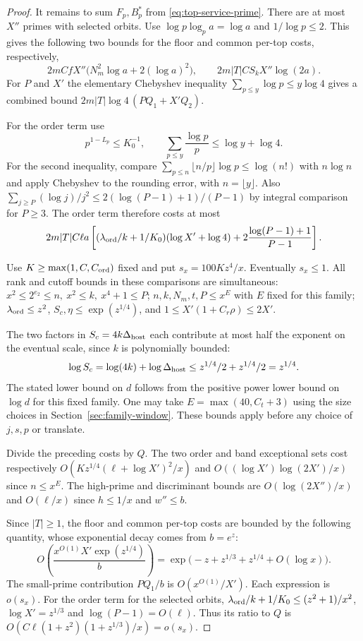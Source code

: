 \begin{proof}
It remains to sum \(F_p,B_p^*\) from \eqref{eq:top-service-prime}.
There are at most \(X''\) primes with selected orbits. Use
\(\log p\log_p a=\log a\) and \(1/\log p\le2\). This gives the
following two bounds for the floor and common per-top costs,
respectively,
\[
 2m C fX''\big(N_m^2\log a+2(\log a)^2\big),
 \qquad 2m|T|C S_kX''\log(2a).
\]
For \(P\) and \(X'\) the elementary Chebyshev inequality
\(\sum_{p\le y}\log p\le y\log4\) gives a combined bound
\(2m|T|\log4\,(P Q_1+X'Q_2)\).

For the order term use
\[
 p^{1-L_p}\le K_0^{-1},\qquad
 \sum_{p\le y}\frac{\log p}{p}\le\log y+\log4 .
\]
For the second inequality, compare
\(\sum_{p\le n}\lfloor n/p\rfloor\log p\le \log(n!)\)
with \(n\log n\) and apply Chebyshev to the rounding error,
with \(n=\lfloor y\rfloor\). Also
\(\sum_{j\ge P}(\log j)/j^2\le
2(\log(P-1)+1)/(P-1)\) by integral comparison for \(P\ge3\).
The order term therefore costs at most
\[
 2m|T|C\ell a\left[
  (\lambda_{\rm ord}/k+1/K_0)(\log X'+\log4)
       +2\frac{\log(P-1)+1}{P-1}\right].
\]

Use \(K\ge\max(1,C,C_{\rm ord})\) fixed and put
\(s_x=100K z^4/x\). Eventually \(s_x\le1\).
All rank and cutoff bounds in these comparisons are simultaneous:
\(x^2\le 2^{e_2}\le n,\ x^2\le k,\ x^4+1\le P\);
\(n,k,N_m,t,P\le x^{E}\) with \(E\) fixed for this family;
\(\lambda_{\rm ord}\le z^2\), \(S_c,\eta\le \exp(z^{1/4})\),
and \(1\le X'(1+C_r\rho)\le 2X'\).

The two factors in \(S_c=4k\Delta_{\rm host}\) each contribute at most half the exponent on the eventual scale, since \(k\) is polynomially bounded:
\[
 \log S_c=\log(4k)+\log\Delta_{\rm host}\le z^{1/4}/2+z^{1/4}/2=z^{1/4}.
\] The stated lower
bound on \(d\) follows from the positive power lower bound on
\(\log d\) for this fixed family. One may take
\(E=\max(40,C_t+3)\) using the size choices in
Section~\ref{sec:family-window}. These bounds apply before any
choice of \(j,s,p\) or translate.

Divide the preceding costs by \(Q\). The two order and band
exceptional sets cost respectively
\(O(K z^{1/4}(\ell+\log X')^2/x)\) and
\(O((\log X')\log(2X')/x)\) since \(n\le x^E\).
The high-prime and discriminant bounds are
\(O(\log(2X'')/x)\) and \(O(\ell/x)\) since \(h\le1/x\) and
\(w''\le b\).

Since \(|T|\ge1\), the floor and common per-top costs are bounded by the following quantity, whose exponential decay comes from \(b=e^z\):
\[
 O\!\left(\frac{x^{O(1)}X'\exp(z^{1/4})}{b}\right)=\exp\bigl(-z+z^{1/3}+z^{1/4}+O(\log x)\bigr).
\]
The small-prime contribution \(P Q_1/b\) is \(O(x^{O(1)}/X')\).
Each expression is \(o(s_x)\). For the order term for the selected orbits,
\(\lambda_{\rm ord}/k+1/K_0\le(z^2+1)/x^2\),
\(\log X'=z^{1/3}\) and \(\log(P-1)=O(\ell)\). Thus its
ratio to \(Q\) is \(O(C\ell(1+z^2)(1+z^{1/3})/x)=o(s_x)\).


\end{proof}
